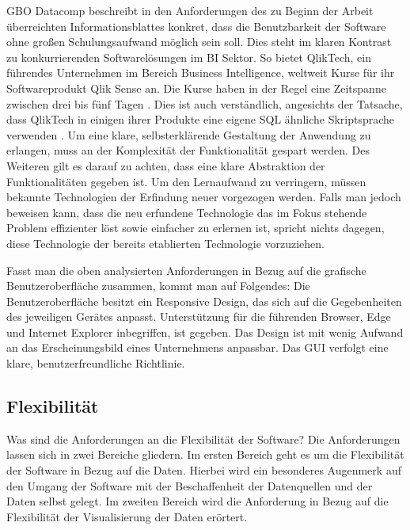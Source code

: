 GBO Datacomp beschreibt in den Anforderungen des zu Beginn der Arbeit überreichten
Informationsblattes konkret, dass die Benutzbarkeit der Software ohne großen Schulungsaufwand möglich sein soll.
Dies steht im klaren Kontrast zu konkurrierenden Softwarelösungen im BI Sektor.
So bietet QlikTech, ein führendes Unternehmen im Bereich Business Intelligence,
weltweit Kurse für ihr Softwareprodukt Qlik Sense an. Die Kurse haben in der
Regel eine Zeitspanne zwischen drei bis fünf Tagen \cite{QlikSenseTraining}.
Dies ist auch verständlich, angesichts der Tatsache, dass QlikTech in einigen
ihrer Produkte eine eigene SQL ähnliche Skriptsprache verwenden \cite{QlikSenseScriptLanguage}.
Um eine klare, selbsterklärende Gestaltung der Anwendung zu erlangen,
muss an der Komplexität der Funktionalität gespart werden. Des Weiteren
gilt es darauf zu achten, dass eine klare Abstraktion der Funktionalitäten
gegeben ist. Um den Lernaufwand zu verringern, müssen bekannte Technologien
der Erfindung neuer vorgezogen werden. Falls man jedoch beweisen kann,
dass die neu erfundene Technologie das im Fokus stehende Problem effizienter löst
sowie einfacher zu erlernen ist, spricht nichts dagegen, diese Technologie der bereits
etablierten Technologie vorzuziehen.

Fasst man die oben analysierten Anforderungen in Bezug auf die grafische Benutzeroberfläche
zusammen, kommt man auf Folgendes: Die Benutzeroberfläche besitzt ein Responsive Design,
das sich auf die Gegebenheiten des jeweiligen Gerätes anpasst. Unterstützung
für die führenden Browser, Edge und Internet Explorer inbegriffen, ist gegeben.
Das Design ist mit wenig Aufwand an das Erscheinungsbild eines Unternehmens anpassbar.
Das GUI verfolgt eine klare, benutzerfreundliche Richtlinie.

\subsection{Flexibilität}
\label{subsec:flexibilitaet}
Was sind die Anforderungen an die Flexibilität der Software? Die Anforderungen lassen sich in zwei
Bereiche gliedern. Im ersten Bereich geht es um die Flexibilität der Software in Bezug auf die Daten. Hierbei wird ein besonderes
Augenmerk auf den Umgang der Software mit der Beschaffenheit der Datenquellen und der Daten selbst gelegt. Im zweiten Bereich
wird die Anforderung in Bezug auf die Flexibilität der Visualisierung der Daten erörtert.

